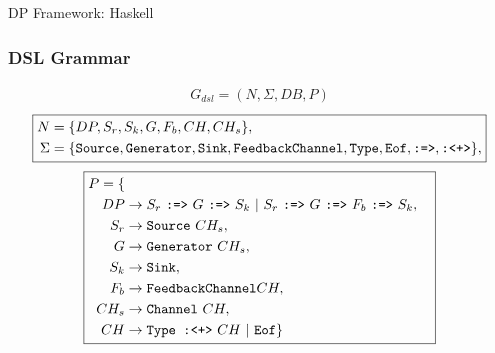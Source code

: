 \documentclass{beamer}
\begin{document}
  \begin{frame}[fragile]{DP Framework: Haskell}
    \frametitle{DSL Grammar}
    \small
    \begin{equation*}
      \boxed{
       \begin{aligned}
      G_{dsl} = (N, \Sigma, DB, P)
      \end{aligned}
      }
  \end{equation*}
  \tiny
      \begin{equation*}
          \boxed{
           \begin{aligned}
          N &= \{DP,S_r,S_k,G,F_b,CH,CH_s\},\\
          \Sigma &= \{\text{\texttt{Source}},\text{\texttt{Generator}},\text{\texttt{Sink}},\text{\texttt{FeedbackChannel}},\text{\texttt{Type}},\text{\texttt{Eof}},\text{\texttt{:=>}},\text{\texttt{:<+>}}\},
          \end{aligned}
          }
      \end{equation*}
    \small
    \begin{equation*}
      \boxed{
        \begin{aligned}
      P = \{\\
      DP  &\rightarrow S_r\ \text{\texttt{:=>}}\ G\ \text{\texttt{:=>}}\ S_k\ |\ S_r\ \text{\texttt{:=>}}\ G\ \text{\texttt{:=>}}\ F_b\ \text{\texttt{:=>}}\ S_k,\\
      S_r &\rightarrow \text{\texttt{Source}}\ CH_s,\\
      G   &\rightarrow \text{\texttt{Generator}}\ CH_s,\\
      S_k &\rightarrow \text{\texttt{Sink}},\\
      F_b &\rightarrow \text{\texttt{FeedbackChannel}} CH,\\
      CH_s &\rightarrow \text{\texttt{Channel}}\ CH,\\
      CH &\rightarrow \text{\texttt{Type :<+>}}\ CH\ |\ \text{\texttt{Eof}}\}
    \end{aligned}
    }
    \end{equation*}
  \end{frame}
\end{document}
